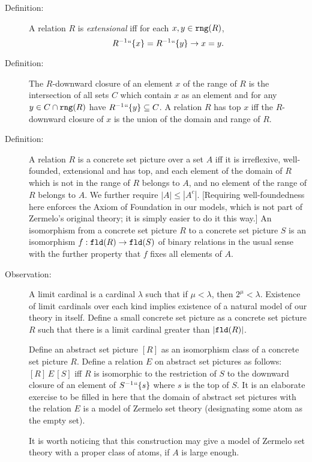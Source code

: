 \documentclass[12pt]{article}
\begin{document}
\begin{description}

\item[Definition:]  A relation $R$ is {\em extensional\/} iff for each $x,y \in{\tt rng}(R)$, $$R^{-1}``\{x \}= R^{-1}``\{y\}\rightarrow x=y.$$ 

\item[Definition:]  The $R$-downward closure of an element $x$ of the range of $R$ is the intersection of all sets $C$ which contain $x$ as an element
and for any $y \in C\cap {\tt rng}(R)$ have $R^{-1}``\{y\} \subseteq C$.  A relation $R$ has top $x$ iff the $R$-downward closure of $x$ is the union of the domain and range of $R$.

\item[Definition:]  A relation $R$ is a concrete set picture over a set $A$ iff it is irreflexive, well-founded, extensional and has top, and each element of the domain of $R$ which is not in the range of $R$ belongs to $A$, and no element of the range of $R$ belongs to $A$.   We further require $|A|\leq |A^c|$.  [Requiring well-foundedness here enforces the Axiom of Foundation in our models, which is not part of Zermelo's original theory;  it is simply easier to do it this way.]  An isomorphism from a concrete set picture $R$ to a concrete set picture $S$ is an isomorphism $f:{\tt fld}(R) \rightarrow {\tt fld}(S)$ of binary relations in the usual sense with the further property that
$f$ fixes all elements of $A$.


\item[Observation:]  A limit cardinal is a cardinal $\lambda$ such that if $\mu<\lambda$, then $2^\mu<\lambda$.  Existence of limit cardinals over each kind implies existence of a natural model of our theory in itself.  Define
a small concrete set picture as a concrete set picture $R$ such that there is a limit cardinal greater than $|{\tt fld}(R)|$.

Define an abstract set picture $[R]$ as an isomorphism class of a concrete set picture $R$.  Define a relation $E$ on
abstract set pictures as follows:  $[R] \,E\,[S]$ iff $R$ is isomorphic to the restriction of $S$ to the downward closure
of an element of $S^{-1}``\{s\}$ where $s$ is the top of $S$.  It is an elaborate exercise to be filled in here that
the domain of abstract set pictures with the relation $E$ is a model of Zermelo set theory (designating some atom as the empty set).

It is worth noticing that this construction may give a model of Zermelo set theory with a proper class of atoms, if $A$ is large enough.


\end{description}
\end{document}
